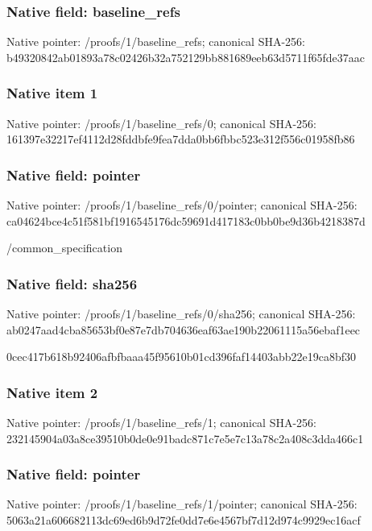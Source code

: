 \documentclass[10pt,a4paper]{article}
\begin{document}
\subsubsection{Native field: baseline\_\allowbreak{}refs}
Native pointer: /proofs/1/baseline\_\allowbreak{}refs; canonical SHA-256: b49320842ab01893a78c02426b32a752129bb881689eeb63d5711f65fde37aac

\subsubsection{Native item 1}
Native pointer: /proofs/1/baseline\_\allowbreak{}refs/0; canonical SHA-256: 161397e32217ef4112d28fddbfe9fea7dda0bb6fbbc523e312f556c01958fb86

\subsubsection{Native field: pointer}
Native pointer: /proofs/1/baseline\_\allowbreak{}refs/0/pointer; canonical SHA-256: ca04624bce4c51f581bf1916545176dc59691d417183c0bb0be9d36b4218387d

\begingroup\raggedright\sloppy /\allowbreak{}common\_\allowbreak{}specification\par\endgroup

\subsubsection{Native field: sha256}
Native pointer: /proofs/1/baseline\_\allowbreak{}refs/0/sha256; canonical SHA-256: ab0247aad4cba85653bf0e87e7db704636eaf63ae190b22061115a56ebaf1eec

\begingroup\raggedright\sloppy 0cec417b618b92406afbfbaaa45f95610b01cd396faf14403abb22e19ca8bf30\par\endgroup

\subsubsection{Native item 2}
Native pointer: /proofs/1/baseline\_\allowbreak{}refs/1; canonical SHA-256: 232145904a03a8ce39510b0de0e91badc871c7e5e7c13a78c2a408c3dda466c1

\subsubsection{Native field: pointer}
Native pointer: /proofs/1/baseline\_\allowbreak{}refs/1/pointer; canonical SHA-256: 5063a21a606682113dc69ed6b9d72fe0dd7e6e4567bf7d12d974c9929ec16acf
\end{document}
